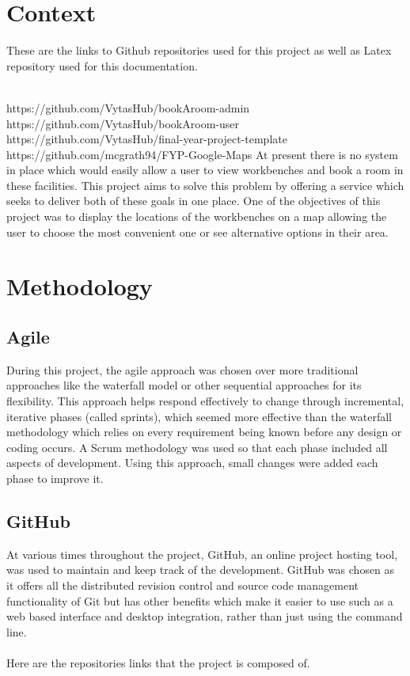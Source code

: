 \chapter{Context}
\begin{itemize}

These are the links to Github repositories used for this project as well as Latex repository used for this documentation.
\bigbreak

\\https://github.com/VytasHub/bookAroom-admin
\\https://github.com/VytasHub/bookAroom-user
\\https://github.com/VytasHub/final-year-project-template
\\https://github.com/mcgrath94/FYP-Google-Maps
\bigbreak
At present there is no system in place which would easily allow a user to view workbenches and book a room in these facilities. This project aims to solve this problem by offering a service which seeks to deliver both of these goals in one place.
One of the objectives of this project was to display the locations of the workbenches on a map allowing the user to choose the most convenient one or see alternative options in their area.



\chapter{Methodology}


\section{Agile}

During this project, the agile approach was chosen over more traditional approaches like the waterfall model or other sequential approaches for its flexibility. This approach helps respond effectively to change through incremental, iterative phases (called sprints), which seemed more effective than the waterfall methodology which relies on every requirement being known before any design or coding occurs. A Scrum methodology was used so that each phase included all aspects of development. Using this approach, small changes were added each phase to improve it.

\section{GitHub}

At various times throughout the project, GitHub, an online project hosting tool, was used to maintain and keep track of the development. GitHub was chosen as it offers all the distributed revision control and source code management functionality of Git but has other benefits which make it easier to use such as a web based interface and desktop integration, rather than just using the command line. 
\\
\\Here are the repositories links that the project is composed of. 


\end{itemize}
